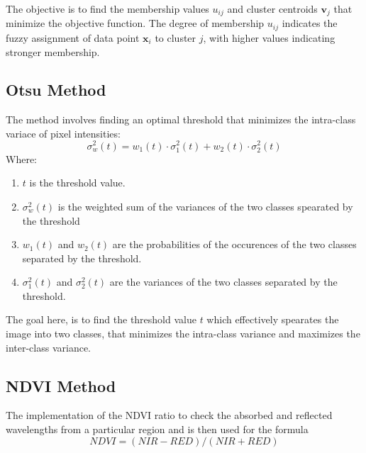 \documentclass[12pt,a4paper,IEEEtran]{article}
\begin{document}
The objective is to find the membership values \( u_{ij} \) and cluster centroids \( \mathbf{v}_j \) that minimize the objective function. The degree of membership \( u_{ij} \) indicates the fuzzy assignment of data point \( \mathbf{x}_i \) to cluster \( j \), with higher values indicating stronger membership.



\subsection[4.2]{Otsu Method}
The method involves finding an optimal threshold that minimizes the intra-class variace of pixel intensities:
\begin{equation}
	\sigma^2_w(t) = w_1(t) \cdot \sigma_1^2(t) + w_2(t) \cdot \sigma_2^2(t)
\end{equation}
Where: 
\begin{enumerate}
	\item $t$ is the threshold value.
	\item $\sigma^2_w(t)$ is the weighted sum of the variances of the two classes spearated by the threshold
	\item $w_1(t)$ and $w_2(t)$ are the probabilities of the occurences of the two classes separated by the threshold.
	\item $\sigma_1^2(t)$ and $\sigma_2^2(t)$ are the variances of the two classes separated by the threshold.
\end{enumerate}
The goal here, is to find the threshold value $t$ which effectively spearates the image into two classes, that minimizes the intra-class variance and maximizes the inter-class variance. \cite{5254345}



\subsection[4.3]{NDVI Method}
The implementation of the NDVI ratio to check the absorbed and reflected wavelengths from a particular region and is then used for the formula  
\begin{equation}
	NDVI = (NIR - RED) / (NIR + RED)
\end{equation}
\end{document}
